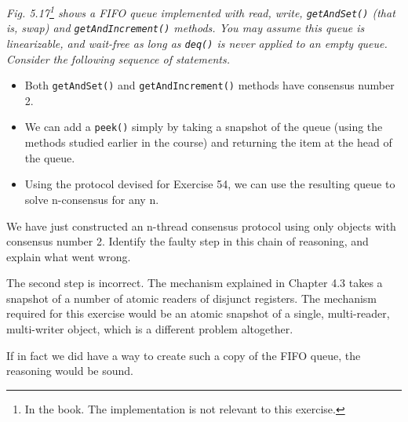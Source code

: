 \documentclass[a4paper,10pt]{article}
\begin{document}
{\itshape Fig. 5.17\footnote{In the book. The implementation is not relevant to this exercise.}
shows a FIFO queue implemented with read, write,
\lstinline|getAndSet()| (that is, swap) and \lstinline|getAndIncrement()| methods. You may assume this queue is linearizable, and wait-free as long as \lstinline|deq()| is never applied to an
empty queue. Consider the following sequence of statements.

\begin{itemize}
\item Both \lstinline|getAndSet()| and \lstinline|getAndIncrement()| methods have consensus number 2.
\item We can add a \lstinline|peek()| simply by taking a snapshot of the queue (using the methods studied earlier in the course) and returning the item at the head of the
queue.
\item Using the protocol devised for Exercise 54, we can use the resulting queue to
solve n-consensus for any n.
\end{itemize}

We have just constructed an n-thread consensus protocol using only objects with
consensus number 2. Identify the faulty step in this chain of reasoning, and
explain what went wrong.}

\vspace{3mm}

The second step is incorrect. The mechanism explained in Chapter 4.3 takes a snapshot
of a number of atomic readers of disjunct registers. The mechanism required for this
exercise would be an atomic snapshot of a single, multi-reader, multi-writer object, which
is a different problem altogether.

If in fact we did have a way to create such a copy of the FIFO queue, the reasoning would be sound.

\begin{comment}

Exercise 51: p139

\subsection{Exercise }

\emph{}

\vspace{3mm}

\vspace{3mm}

\begin{align}
S(p) &= \frac{s}{s'} = \frac{2s(p - 1)}{s(p - 1) - 1} \\
     &= \frac{2 \cdot \frac{3}{10} \cdot (p - 1)}{\frac{3}{10} \cdot (p - 1) - 1} 
\end{align}

\begin{figure}
\begin{lstlisting}

\end{lstlisting}
\caption{The Flaky lock used in Exercise 11.}
\label{fig:flaky}
\end{figure}

\end{comment}
\end{document}
